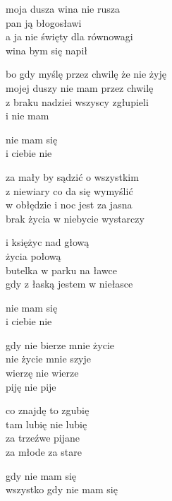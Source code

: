 \begin{text}
    moja dusza wina nie rusza\\
    pan ją błogosławi\\
    a ja nie święty dla równowagi\\
    wina bym się napił

    bo gdy myślę przez chwilę że nie żyję\\
    mojej duszy nie mam przez chwilę\\
    z braku nadziei wszyscy zgłupieli\\
    i nie mam

    nie mam się\\
    i ciebie nie

    za mały by sądzić o wszystkim\\
    z niewiary co da się wymyślić\\
    w obłędzie i noc jest za jasna\\
    brak życia w niebycie wystarczy

    i księżyc nad głową\\
    życia połową\\
    butelka w parku na ławce\\
    gdy z łaską jestem w niełasce

    nie mam się\\
    i ciebie nie

    gdy nie bierze mnie życie\\
    nie życie mnie szyje\\
    wierzę nie wierze\\
    piję nie pije

    co znajdę to zgubię\\
    tam lubię nie lubię\\
    za trzeźwe pijane\\
    za młode za stare

    gdy nie mam się\\
    wszystko gdy nie mam się
\end{text}
\begin{chord}

\end{chord}